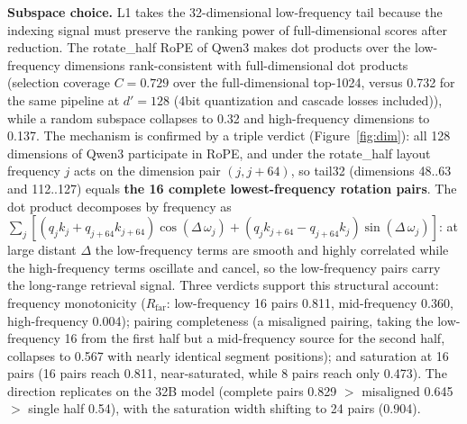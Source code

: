 \documentclass[11pt]{article}
\begin{document}
\textbf{Subspace choice.} L1 takes the 32-dimensional low-frequency tail because the indexing signal must preserve the ranking power of full-dimensional scores after reduction. The rotate\_half RoPE of Qwen3 makes dot products over the low-frequency dimensions rank-consistent with full-dimensional dot products (selection coverage $C{=}0.729$ over the full-dimensional top-1024, versus 0.732 for the same pipeline at $d'{=}128$ (4bit quantization and cascade losses included)), while a random subspace collapses to 0.32 and high-frequency dimensions to 0.137. The mechanism is confirmed by a triple verdict (Figure~\ref{fig:dim}): all 128 dimensions of Qwen3 participate in RoPE, and under the rotate\_half layout frequency $j$ acts on the dimension pair $(j, j{+}64)$, so tail32 (dimensions 48..63 and 112..127) equals \textbf{the 16 complete lowest-frequency rotation pairs}. The dot product decomposes by frequency as $\sum_j [(q_j k_j + q_{j+64} k_{j+64})\cos(\Delta\,\omega_j) + (q_j k_{j+64} - q_{j+64} k_j)\sin(\Delta\,\omega_j)]$: at large distant $\Delta$ the low-frequency terms are smooth and highly correlated while the high-frequency terms oscillate and cancel, so the low-frequency pairs carry the long-range retrieval signal. Three verdicts support this structural account: frequency monotonicity ($R_{\mathrm{far}}$: low-frequency 16 pairs 0.811, mid-frequency 0.360, high-frequency 0.004); pairing completeness (a misaligned pairing, taking the low-frequency 16 from the first half but a mid-frequency source for the second half, collapses to 0.567 with nearly identical segment positions); and saturation at 16 pairs (16 pairs reach 0.811, near-saturated, while 8 pairs reach only 0.473). The direction replicates on the 32B model (complete pairs 0.829 $>$ misaligned 0.645 $>$ single half 0.54), with the saturation width shifting to 24 pairs (0.904).
\end{document}
